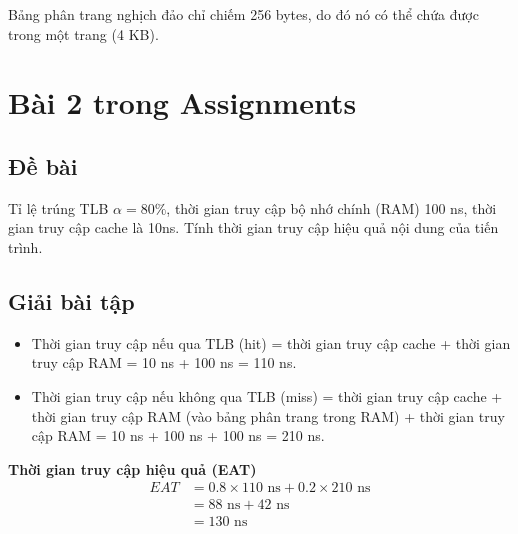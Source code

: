 \documentclass[12pt, letterpaper]{article}
\begin{document}
Bảng phân trang nghịch đảo chỉ chiếm 256 bytes, do đó nó có thể chứa được trong một trang (4 KB).
\section{Bài 2 trong Assignments}
\subsection{Đề bài}
Tỉ lệ trúng TLB $\alpha=80\%$, thời gian truy cập bộ nhớ  chính (RAM) 100 ns, thời gian truy cập cache là 10ns. Tính thời gian truy cập  hiệu quả nội  dung của tiến trình.
\subsection{Giải bài tập}
\begin{itemize}
    \item Thời gian truy cập nếu qua TLB (hit) = thời gian truy cập cache + thời gian truy cập RAM = 10 ns + 100 ns = 110 ns. \\
    \item Thời gian truy cập nếu không qua TLB (miss) = thời gian truy cập cache + thời gian truy cập RAM (vào bảng phân trang trong RAM) + thời gian truy cập RAM = 10 ns + 100 ns + 100 ns = 210 ns. \\
\end{itemize}
\textbf{Thời gian truy cập hiệu quả (EAT)}
\begin{align*}
    EAT &= 0.8 \times 110 \text{ ns} + 0.2 \times 210 \text{ ns} \\
    &= 88 \text{ ns} + 42 \text{ ns} \\
    &= 130 \text{ ns}
\end{align*}
\end{document}
